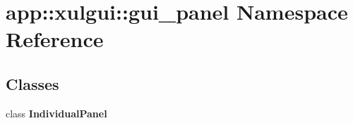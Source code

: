 \section{app::xulgui::gui\_\-panel Namespace Reference}
\label{namespaceapp_1_1xulgui_1_1gui__panel}


\subsection*{Classes}
\begin{CompactItemize}
\item 
class {\bf IndividualPanel}
\end{CompactItemize}
